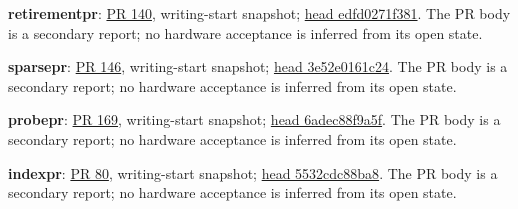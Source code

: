 \begin{description}[style=nextline]
\item\label{e:retirementpr}\textbf{retirementpr}:
\href{\repobase/pull/140}{PR 140}, writing-start snapshot;
\href{\repobase/commit/edfd0271f38111b6ba32b14d7fd6cf78d8deaeb9}{head edfd0271f381}.
The PR body is a secondary report; no hardware acceptance is inferred from its open state.

\item\label{e:sparsepr}\textbf{sparsepr}:
\href{\repobase/pull/146}{PR 146}, writing-start snapshot;
\href{\repobase/commit/3e52e0161c24547bf2e68d90e79b07c26a30df6d}{head 3e52e0161c24}.
The PR body is a secondary report; no hardware acceptance is inferred from its open state.

\item\label{e:probepr}\textbf{probepr}:
\href{\repobase/pull/169}{PR 169}, writing-start snapshot;
\href{\repobase/commit/6adec88f9a5f0b847084fbcc8f3d0365b49faa0a}{head 6adec88f9a5f}.
The PR body is a secondary report; no hardware acceptance is inferred from its open state.

\item\label{e:indexpr}\textbf{indexpr}:
\href{\repobase/pull/80}{PR 80}, writing-start snapshot;
\href{\repobase/commit/5532cdc88ba8b3e4513aafd54ab095aac906b659}{head 5532cdc88ba8}.
The PR body is a secondary report; no hardware acceptance is inferred from its open state.

\end{description}


